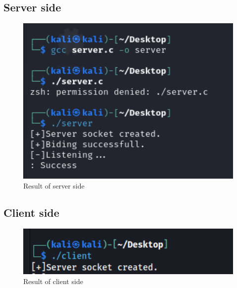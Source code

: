 \documentclass{article}
\begin{document}
\subsection{Server side}
\begin{figure}[h]
    \centering
    \includegraphics[width=1\textwidth]{server.png}
    \caption{Result of server side}
\end{figure}

\subsection{Client side}
\begin{figure}
    \centering
    \includegraphics[width=1\textwidth]{client.png}
    \caption{Result of client side}
\end{figure}
\end{document}
